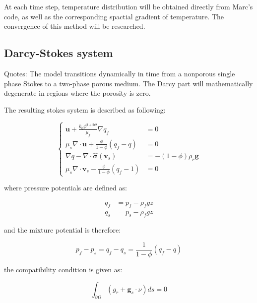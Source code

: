 At each time step, temperature distribution will be 
obtained directly from Marc's code, as well as
the corresponding spactial gradient of temperature.
The convergence of this method will be researched.

\newpage

\subsection{Darcy-Stokes system}

Quotes: The model transitions dynamically in time from a nonporous single phase Stokes to a 
two-phase porous medium. 
The Darcy part will mathematically degenerate in regions where the porosity is zero.

The  resulting stokes system is described as following:

		  \begin{equation*}
					 \left \{
					 \begin{aligned}
								\boldsymbol u + \frac{k_0 \phi^{2+2\Theta}}{\mu_f}\nabla q_f &= 0\\
								\mu_s \nabla \cdot \boldsymbol u + \frac{\phi}{1-\phi}(q_f-q) &=0 \\
								\nabla q - \nabla \cdot \hat{\boldsymbol \sigma}(\boldsymbol v_s) &= -(1-\phi)\rho_r \boldsymbol g\\
								\mu_s \nabla \cdot \boldsymbol v_s - \frac{\phi}{1-\phi}(q_f-1) &=0
					 \end{aligned}
					 \right .
		  \end{equation*}

where pressure potentials are defined as:

		  \begin{equation*}
            \begin{aligned}
						  q_f &= p_f - \rho_f g z \\
						  q_s &= p_s - \rho_f g z
				\end{aligned}
		  \end{equation*}

and the mixture potential is therefore:

\begin{equation*}
		  p_f - p_s = q_f - q_s = \frac{1}{1-\phi}(q_f - q)
\end{equation*}

the compatibility condition is given as:

\begin{equation*}
		  \int_{\partial \Omega}(g_r + \boldsymbol g_s \cdot \nu)ds = 0
\end{equation*}

